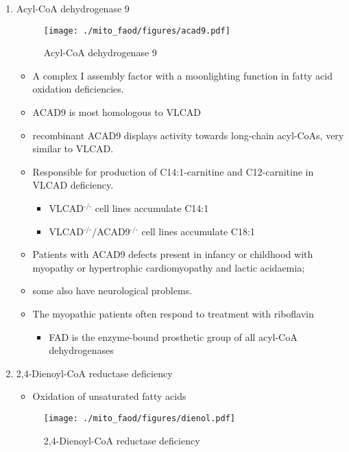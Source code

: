\documentclass{scrartcl}
\begin{document}
\begin{enumerate}
\item Acyl-CoA dehydrogenase 9
\label{sec:orgd55bcfe}
\begin{figure}[htbp]
\centering
\texttt{[image: ./mito\_faod/figures/acad9.pdf]}
\caption{\label{fig:org655da36}
Acyl-CoA dehydrogenase 9}
\end{figure}

\begin{itemize}
\item A complex I assembly factor with a moonlighting function in fatty
acid oxidation deficiencies.
\item ACAD9 is most homologous to VLCAD
\item recombinant ACAD9 displays activity towards long-chain acyl-CoAs,
very similar to VLCAD.
\item Responsible for production of C14:1-carnitine and C12-carnitine in
VLCAD deficiency.
\begin{itemize}
\item VLCAD\(^{\text{-/-}}\) cell lines accumulate C14:1
\item VLCAD\(^{\text{-/-}}\)/ACAD9\(^{\text{-/-}}\) cell lines accumulate C18:1
\end{itemize}
\item Patients with ACAD9 defects present in infancy or childhood with
myopathy or hypertrophic cardiomyopathy and lactic acidaemia;
\item some also have neurological problems.
\item The myopathic patients often respond to treatment with riboflavin
\begin{itemize}
\item FAD is the enzyme-bound prosthetic group of all acyl-CoA
dehydrogenases
\end{itemize}
\end{itemize}

\item 2,4-Dienoyl-CoA reductase deficiency
\label{sec:org889daea}
\begin{itemize}
\item Oxidation of unsaturated fatty acids
\end{itemize}

\begin{figure}[htbp]
\centering
\texttt{[image: ./mito\_faod/figures/dienol.pdf]}
\caption{\label{fig:orgcc89116}
2,4-Dienoyl-CoA reductase deficiency}
\end{figure}



\end{enumerate}
\end{document}
